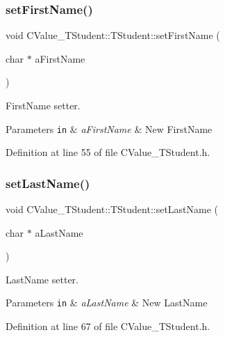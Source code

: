 \subsubsection{\texorpdfstring{set\+First\+Name()}{setFirstName()}}
{\footnotesize\ttfamily void C\+Value\+\_\+\+T\+Student\+::\+T\+Student\+::set\+First\+Name (\begin{DoxyParamCaption}\item[{char $\ast$}]{a\+First\+Name }\end{DoxyParamCaption})\hspace{0.3cm}{\ttfamily [inline]}}



First\+Name setter. 


\begin{DoxyParams}[1]{Parameters}
\mbox{\tt in}  & {\em a\+First\+Name} & New First\+Name \\
\hline
\end{DoxyParams}


Definition at line 55 of file C\+Value\+\_\+\+T\+Student.\+h.

\mbox{\label{class_c_value___t_student_1_1_t_student_a636775dee38bbcb2e4216f5c0bf91890}} 
\subsubsection{\texorpdfstring{set\+Last\+Name()}{setLastName()}}
{\footnotesize\ttfamily void C\+Value\+\_\+\+T\+Student\+::\+T\+Student\+::set\+Last\+Name (\begin{DoxyParamCaption}\item[{char $\ast$}]{a\+Last\+Name }\end{DoxyParamCaption})\hspace{0.3cm}{\ttfamily [inline]}}



Last\+Name setter. 


\begin{DoxyParams}[1]{Parameters}
\mbox{\tt in}  & {\em a\+Last\+Name} & New Last\+Name \\
\hline
\end{DoxyParams}


Definition at line 67 of file C\+Value\+\_\+\+T\+Student.\+h.

